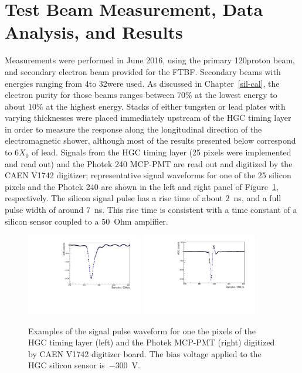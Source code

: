 \section{Test Beam Measurement, Data Analysis, and
  Results}\label{hgc:results}
Measurements were performed in June 2016, using the primary 120\GeV proton
beam, and secondary electron
beam provided for the FTBF. Secondary beams with energies ranging from
4\GeV to 32\GeV were used. As discussed in Chapter~\ref{sil-cal}, the electron purity for those beams ranges
between $70\%$ at the lowest energy to about $10\%$ at the highest energy.
Stacks of either tungsten or lead plates with varying thicknesses were placed immediately
upstream of the HGC timing layer in order to measure the response along the
longitudinal direction of the electromagnetic shower, although most of
the results presented below correspond to 6$X_{0}$ of lead. Signals from
the HGC timing layer (25 pixels were implemented and read out) and the Photek 240 MCP-PMT are read out and digitized by the CAEN
V1742 digitizer; representative signal waveforms  for one of the 25
silicon pixels and the Photek 240 are shown in the left and right panel of
Figure~\ref{hgc:pulses}, respectively. The silicon signal pulse has a rise time of
about $2$~ns, and a full pulse width of around $7$~ns. This rise time is
consistent with a time constant of a silicon sensor coupled to a
50~Ohm amplifier.
\begin{figure}[h] 
\centering
\includegraphics[width=0.45\textwidth]{HGC/HGC_RAWpulse.pdf} 
\includegraphics[width=0.45\textwidth]{HGC/photek_example.pdf} 
\caption{Examples of the signal pulse waveform for one the pixels of
  the HGC timing layer (left) and the Photek MCP-PMT (right) digitized by CAEN V1742 digitizer board. The bias
voltage applied to the HGC silicon sensor is~$-300$~V.} 
\label{hgc:pulses} 
\end{figure} 

